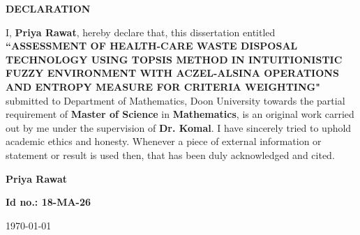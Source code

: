 \begin{center}
  {\LARGE{\bf{DECLARATION}}}
\end{center}

\vspace{2em}

I, \textbf{Priya Rawat}, hereby declare that, this dissertation entitled \textbf{\MakeUppercase{``ASSESSMENT OF HEALTH-CARE WASTE DISPOSAL TECHNOLOGY using TOPSIS Method in 
\newline
Intuitionistic Fuzzy Environment with Aczel-Alsina 
\newline
Operations and Entropy Measure for Criteria Weighting"}} submitted to Department of Mathematics, Doon University towards the partial requirement of \textbf{Master of Science} in \textbf{Mathematics}, is an original work carried out by me under the supervision of \textbf{Dr. Komal}. I have sincerely tried to uphold academic ethics and honesty. Whenever a piece of external information or statement or result is used then, that has been duly acknowledged and cited.


\vspace{28em} %

 \hfill \textbf{Priya Rawat}
 
 \hfill \textbf{Id no.: 18-MA-26}

\noindent \today \hfill

\clearpage
